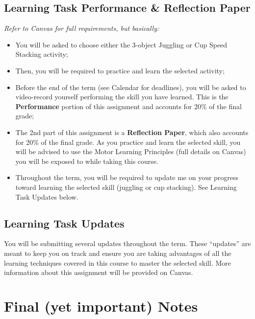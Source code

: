 \documentclass[11pt,]{article}
\providecommand{\tightlist}{%
  \setlength{\itemsep}{0pt}\setlength{\parskip}{0pt}}
\begin{document}
\hypertarget{learning-task-performance-reflection-paper}{%
\subsection{Learning Task Performance \& Reflection
Paper}\label{learning-task-performance-reflection-paper}}

\emph{Refer to Canvas for full requirements, but basically:}

\begin{itemize}
\tightlist
\item
  You will be asked to choose either the 3-object Juggling or Cup Speed
  Stacking activity;
\item
  Then, you will be required to practice and learn the selected
  activity;
\item
  Before the end of the term (see Calendar for deadlines), you will be
  asked to video-record yourself performing the skill you have learned.
  This is the \textbf{Performance} portion of this assignment and
  accounts for 20\% of the final grade;
\item
  The 2nd part of this assignment is a \textbf{Reflection Paper}, which
  also accounts for 20\% of the final grade. As you practice and learn
  the selected skill, you will be advised to use the Motor Learning
  Principles (full details on Canvas) you will be exposed to while
  taking this course.
\item
  Throughout the term, you will be required to update me on your
  progress toward learning the selected skill (juggling or cup
  stacking). See Learning Task Updates below.
\end{itemize}

\hypertarget{learning-task-updates}{%
\subsection{Learning Task Updates}\label{learning-task-updates}}

You will be submitting several updates throughout the term. These
``updates'' are meant to keep you on track and ensure you are taking
advantages of all the learning techniques covered in this course to
master the selected skill. More information about this assignment will
be provided on Canvas.

\hypertarget{final-yet-important-notes}{%
\section{Final (yet important) Notes}\label{final-yet-important-notes}}
\end{document}
